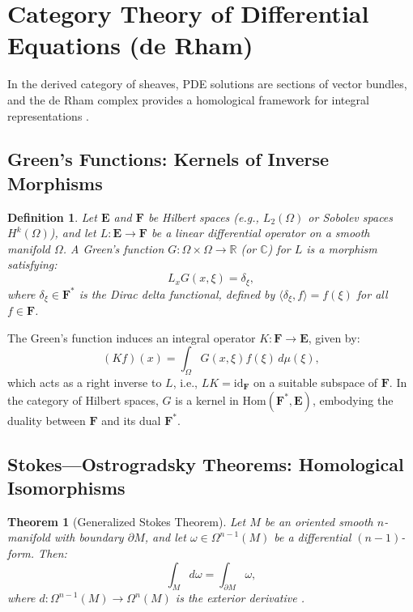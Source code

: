 \documentclass{article}
\theoremstyle{plain}
\newtheorem{theorem}{Theorem}[section]
\newtheorem{definition}{Definition}[section]
\newcommand{\cat}[1]{\mathbf{#1}}
\newcommand{\Hom}{\mathrm{Hom}}
\newcommand{\id}{\mathrm{id}}
\begin{document}
\section{Category Theory of Differential Equations (de Rham)}
In the derived category of sheaves, PDE solutions are sections of vector bundles,
and the de Rham complex provides a homological framework for integral representations \cite{nLab_de_Rham_theorem}.

\subsection{Green's Functions: Kernels of Inverse Morphisms}

\begin{definition}
Let \(\cat{E}\) and \(\cat{F}\) be Hilbert spaces (e.g., \(L_2(\Omega)\)
or Sobolev spaces \(H^k(\Omega)\)), and let \(L: \cat{E} \to \cat{F}\)
be a linear differential operator on a smooth manifold \(\Omega\).
A \emph{Green's function} \(G: \Omega \times \Omega \to \mathbb{R}\)
(or \(\mathbb{C}\)) for \(L\) is a morphism satisfying:
\[
L_x G(x, \xi) = \delta_\xi,
\]
where \(\delta_\xi \in \cat{F}^*\) is the Dirac delta functional,
defined by \(\langle \delta_\xi, f \rangle = f(\xi)\) for all \(f \in \cat{F}\).
\end{definition}

The Green's function induces an integral operator \(K: \cat{F} \to \cat{E}\), given by:
\[
(K f)(x) = \int_\Omega G(x, \xi) f(\xi) \, d\mu(\xi),
\]
which acts as a right inverse to \(L\), i.e., \(L K = \id_{\cat{F}}\)
on a suitable subspace of \(\cat{F}\). In the category of Hilbert spaces,
\(G\) is a kernel in \(\Hom(\cat{F}^*, \cat{E})\), embodying the duality
between \(\cat{F}\) and its dual \(\cat{F}^*\).

\subsection{Stokes---Ostrogradsky Theorems: Homological Isomorphisms}

\begin{theorem}[Generalized Stokes Theorem]
Let \(M\) be an oriented smooth \(n\)-manifold with boundary \(\partial M\), and let \(\omega \in \Omega^{n-1}(M)\) be a differential \((n-1)\)-form. Then:
\[
\int_M d\omega = \int_{\partial M} \omega,
\]
where \(d: \Omega^{n-1}(M) \to \Omega^n(M)\) is the exterior derivative \cite{nLab_stokes_theorem}.
\end{theorem}
\end{document}
